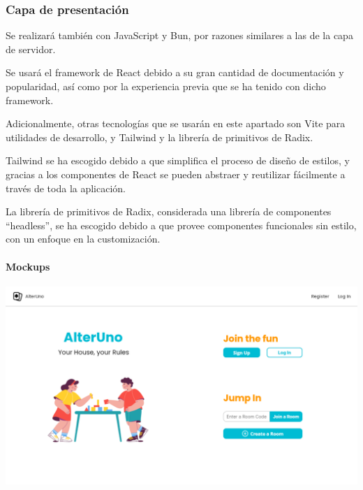 \subsubsection{Capa de presentación}

Se realizará también con JavaScript y Bun, por razones similares a las de la capa de servidor. 

Se usará el framework de React debido a su gran cantidad de documentación y popularidad, así como por la experiencia previa que se ha tenido con dicho framework. 

Adicionalmente, otras tecnologías que se usarán en este apartado son Vite para utilidades de desarrollo, y Tailwind y la librería de primitivos de Radix. 

Tailwind se ha escogido debido a que simplifica el proceso de diseño de estilos, y gracias a los componentes de React se pueden abstraer y reutilizar fácilmente a través de toda la aplicación. 

La librería de primitivos de Radix, considerada una librería de componentes “headless”, se ha escogido debido a que provee componentes funcionales sin estilo, con un enfoque en la customización. 

\paragraph{Mockups}

\begin{center}
  \includegraphics[width=1\textwidth]{img/Mockup Main Page}
   \label{fig:mainmockup}
\end{center}

